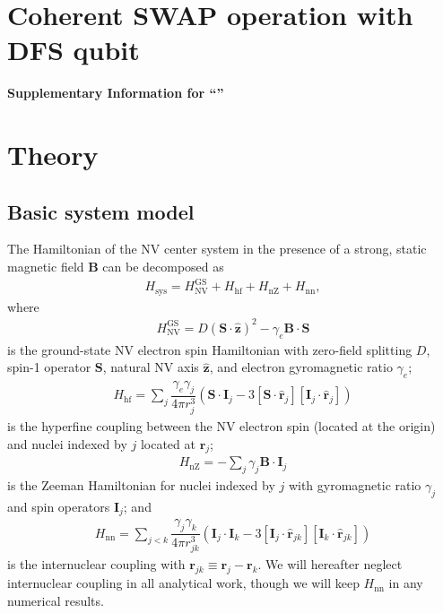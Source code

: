 \documentclass[twocolumn]{revtex4-1}
\renewcommand{\t}{\text} %
\newcommand{\f}[2]{\dfrac{#1}{#2}} %
\newcommand{\p}[1]{\left(#1\right)} %
\renewcommand{\sp}[1]{\left[#1\right]} %
\renewcommand{\v}{\bm} %
\newcommand{\uv}[1]{\hat{\v{#1}}} %
\renewcommand{\c}{\cdot} %
\newcommand{\NV}{\t{NV}}
\begin{document}
\section{Coherent SWAP operation with DFS qubit}






\pagebreak
\clearpage
\widetext
\makeatletter
\begin{center}
  \large \bf Supplementary Information for ``\@title''
\end{center}
\setcounter{equation}{0}
\setcounter{figure}{0}
\setcounter{table}{0}
\setcounter{page}{1}
\renewcommand{\theequation}{S\arabic{equation}}
\renewcommand{\thefigure}{S\arabic{figure}}
\renewcommand{\bibnumfmt}[1]{[S#1]}
\renewcommand{\citenumfont}[1]{S#1}

\tableofcontents{}

\section{Theory}

\subsection{Basic system model}

The Hamiltonian of the NV center system in the presence of a strong,
static magnetic field $\v B$ can be decomposed as
\begin{align}
  H_\t{sys} = H_\NV^\t{GS} + H_\t{hf} + H_\t{nZ}  + H_\t{nn},
\end{align}
where
\begin{align}
  H_\NV^\t{GS} = D\p{\v S\c\uv z}^2 - \gamma_e\v B\c\v S
\end{align}
is the ground-state NV electron spin Hamiltonian with zero-field
splitting $D$, spin-1 operator $\v S$, natural NV axis $\uv z$, and
electron gyromagnetic ratio $\gamma_e$;
\begin{align}
  H_\t{hf} = \sum_j\f{\gamma_e\gamma_j}{4\pi r_j^3}
  \p{\v S\c\v I_j-3\sp{\v S\c\uv r_j}\sp{\v I_j\c\uv r_j}}
\end{align}
is the hyperfine coupling between the NV electron spin (located at the
origin) and nuclei indexed by $j$ located at $\v r_j$;
\begin{align}
  H_\t{nZ} = -\sum_j\gamma_j\v B\c\v I_j
\end{align}
is the Zeeman Hamiltonian for nuclei indexed by $j$ with gyromagnetic
ratio $\gamma_j$ and spin operators $\v I_j$; and
\begin{align}
  H_\t{nn} = \sum_{j<k}\f{\gamma_j\gamma_k}{4\pi r_{jk}^3}
  \p{\v I_j\c\v I_k-3\sp{\v I_j\c\uv r_{jk}}\sp{\v I_k\c\uv r_{jk}}}
\end{align}
is the internuclear coupling with $\v r_{jk}\equiv\v r_j-\v r_k$. We
will hereafter neglect internuclear coupling in all analytical work,
though we will keep $H_\t{nn}$ in any numerical results.
\end{document}
